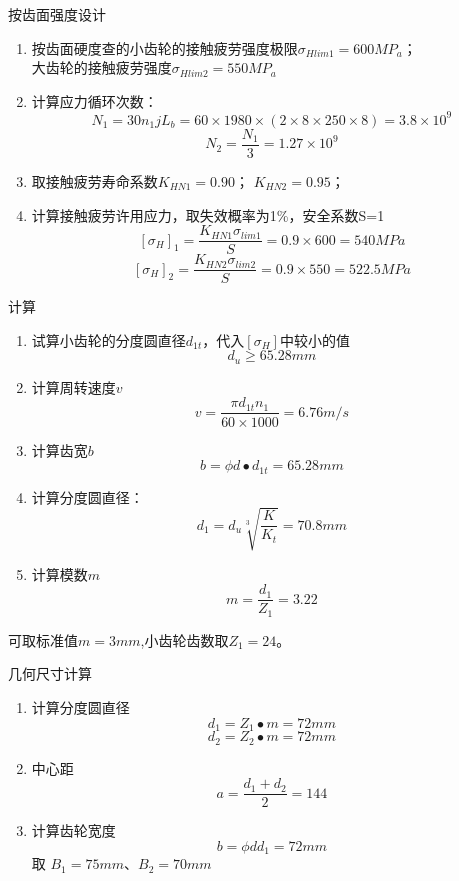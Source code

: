 \documentclass[12pt,xcolor={rgb}]{beamer}
\begin{document}
\begin{frame}{按齿面强度设计}
\begin{enumerate}[]
	\item 按齿面硬度查的小齿轮的接触疲劳强度极限$\sigma _{H lim1}=600MP_a $；\\大齿轮的接触疲劳强度$\sigma _{H lim2}=550MP_a $
\item 计算应力循环次数： $$N_1=30n_1jL_b=60\times 1980 \times (2\times 8\times 250\times 8)=3.8\times 10^9$$
$$N_2=\frac{N_1}{3}=1.27\times 10^9$$
\item 取接触疲劳寿命系数$K_{HN1}=0.90$； $K_{HN2}=0.95$；
\item  计算接触疲劳许用应力，取失效概率为1\%，安全系数S=1
$$ [\sigma_H]_1= \frac{K_{HN1}\sigma_{lim1}}{S} =0.9\times 600=540MPa $$
$$ [\sigma_H]_2= \frac{K_{HN2}\sigma_{lim2}}{S} =0.9\times 550=522.5MPa $$
	\end{enumerate}
\end{frame}

\begin{frame}{计算}
\begin{enumerate}[]
	\item 试算小齿轮的分度圆直径$d_{1t}$，代入$[\sigma _H]$中较小的值
	$$d_u\geq 65.28mm$$
	\item 计算周转速度$v$ $$v=\frac{\pi d_{1t}n_1}{60\times 1000}=6.76m/s$$ \item 计算齿宽$b$ $$ b=\phi d \bullet d_{1t}=65.28mm$$
	\item 计算分度圆直径： $$ d_1= d_u \sqrt[3]{\frac{K}{K_t} }=70.8mm$$
	\item 计算模数$m$ $$ m=\frac{d_1}{Z_1}=3.22$$
\end{enumerate}
可取标准值$m=3mm$,小齿轮齿数取$Z_1=24$。
\end{frame}

\begin{frame}{几何尺寸计算}
\begin{enumerate}[]
	\item 计算分度圆直径 $$d_1=Z_1\bullet m=72mm$$ $$d_2=Z_2\bullet m=72mm$$
	\item 中心距 $$ a=\frac{d_1+d_2}{2} =144$$
	\item 计算齿轮宽度 $$b=\phi d d_1 =72mm$$
	取 $B_1=75mm$、$B_2=70mm$
\end{enumerate}
\end{frame}
\end{document}
